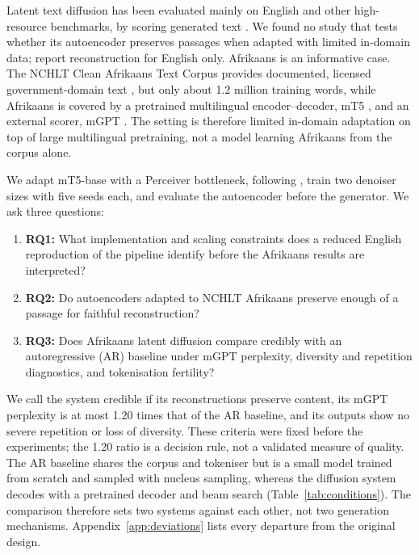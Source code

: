 \documentclass[11pt,a4paper]{article}
\begin{document}
Latent text diffusion has been evaluated mainly on English and other high-resource benchmarks, by scoring generated text \citep{li2022diffusionlm,gong2023diffuseq,lovelace2023latent}. We found no study that tests whether its autoencoder preserves passages when adapted with limited in-domain data; \citet{lovelace2023latent} report reconstruction for English only. Afrikaans is an informative case. The NCHLT Clean Afrikaans Text Corpus provides documented, licensed government-domain text \citep{eiselen2014developing}, but only about 1.2 million training words, while Afrikaans is covered by a pretrained multilingual encoder--decoder, mT5 \citep{xue2021mt5}, and an external scorer, mGPT \citep{shliazhko2024mgpt}. The setting is therefore limited in-domain adaptation on top of large multilingual pretraining, not a model learning Afrikaans from the corpus alone.

We adapt mT5-base with a Perceiver bottleneck, following \citet{lovelace2023latent}, train two denoiser sizes with five seeds each, and evaluate the autoencoder before the generator. We ask three questions:
\begin{enumerate}
\item \textbf{RQ1:} What implementation and scaling constraints does a reduced English reproduction of the pipeline identify before the Afrikaans results are interpreted?
\item \textbf{RQ2:} Do autoencoders adapted to NCHLT Afrikaans preserve enough of a passage for faithful reconstruction?
\item \textbf{RQ3:} Does Afrikaans latent diffusion compare credibly with an autoregressive (AR) baseline under mGPT perplexity, diversity and repetition diagnostics, and tokenisation fertility?
\end{enumerate}

We call the system credible if its reconstructions preserve content, its mGPT perplexity is at most 1.20 times that of the AR baseline, and its outputs show no severe repetition or loss of diversity. These criteria were fixed before the experiments; the 1.20 ratio is a decision rule, not a validated measure of quality. The AR baseline shares the corpus and tokeniser but is a small model trained from scratch and sampled with nucleus sampling, whereas the diffusion system decodes with a pretrained decoder and beam search (Table~\ref{tab:conditions}). The comparison therefore sets two systems against each other, not two generation mechanisms. Appendix~\ref{app:deviations} lists every departure from the original design.
\end{document}
